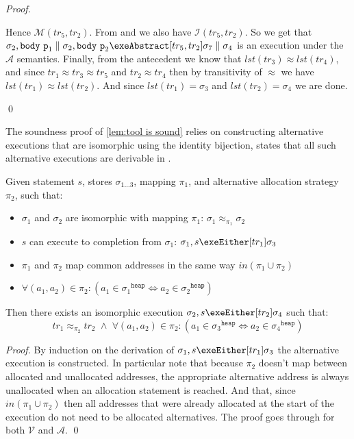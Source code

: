\documentclass[runningheads,a4paper]{llncs}
\DeclareMathOperator{\band}{\bm{\;\land\;}}
\DeclareMathOperator{\suchthat}{:}
\newcommand*{\qvars}[2]{#1_{#2}}
\newcommand*{\last}[1]{\mathit{lst}(#1)}
\newcommand{\tr}{tr}
\newcommand*\iso{\approx}
\newcommand*{\parcomp}{\parallel}
\newcommand*\Asemantics{\mathcal{A}}
\newcommand*\asemantics{$\Asemantics$ semantics}
\newcommand*\Vsemantics{\mathcal{V}}
\newcommand*{\body}{\mathtt{body}}
\newcommand*{\fun}{\texttt{p}}
\newcommand*{\bijection}[1]{\mathit{in}{\left(#1\right)}}
\newcommand*{\isoR}{\mathcal{I}}
\newcommand*{\mutR}{\mathcal{M}}
\newcommand*{\store}{\sigma}
\newcommand*{\heapof}[1]{{#1}^{\mathtt{heap}}}
\begin{document}
\begin{proof}
\begin{itemize}
Hence $\mutR(\tr_5,\tr_2)$. From \tagfive{} and \tagsix{} we also have $\isoR(\tr_5,\tr_2)$. So we get that $\store_2,\body~\fun_1\parcomp\store_2,\body~\fun_2\exeAbstract[\tr_5,\tr_2]\store_7\parcomp\store_4$ is an execution under the \asemantics{}. 
%
Finally, from the antecedent we know that $\last{\tr_3}\iso\last{\tr_4}$, and since $\tr_1\iso\tr_3\iso\tr_5$ and $\tr_2\iso\tr_4$ then by transitivity of $\iso$ we have $\last{\tr_1}\iso\last{\tr_2}$. And since $\last{\tr_1}=\store_3$ and $\last{\tr_2}=\store_4$ we are done.
%
\end{itemize}\qed\end{proof}

The soundness proof of \cref{lem:tool is sound} relies on constructing alternative executions that are isomorphic using the identity bijection,  states that all such alternative executions are derivable in \lang{}.

\begin{lemma}\label{lem:sufficient non-determinism}\setlength{\parindent}{0cm}
Given statement $s$, stores $\qvars{\store}{1 \ldots 3}$, mapping $\pi_1$, and alternative allocation strategy $\qvars{\pi}{2}$, such that: 
\begin{itemize}
	\item $\store_1$ and $\store_2$ are isomorphic with mapping $\pi_1$: $\store_1 \iso_{\pi_1} \store_2$
	\item $s$ can execute to completion from $\store_1$: $\store_1,s\exeEither[\tr_1]\store_3$
	\item $\pi_1$ and $\pi_2$ map common addresses in the same way $\bijection{\pi_1 \cup \pi_2}$
	\item %
		$\forall (a_1,a_2) \in \pi_2 \suchthat (a_1 \in \heapof{\store_1} \iff a_2 \in \heapof{\store_2})$
\end{itemize}

Then there exists an isomorphic execution $\store_2,s\exeEither[\tr_2]\store_4$ such that:
	\[\tr_1 \iso_{\pi_2} \tr_2 \band \forall (a_1,a_2) \in \pi_2 \suchthat (a_1 \in \heapof{\store_3} \iff a_2 \in \heapof{\store_4})\]
\end{lemma}
\begin{proof}By induction on the derivation of $\store_1,s\exeEither[\tr_1]\store_3$ the alternative execution is constructed. In particular note that because $\pi_2$ doesn't map between allocated and unallocated addresses, the appropriate alternative address is always unallocated when an allocation statement is reached. And that, since $\bijection{\pi_1 \cup \pi_2}$ then all addresses that were already allocated at the start of the execution do not need to be allocated alternatives. The proof goes through for both $\Vsemantics$ and $\Asemantics$.
\qed\end{proof}
\end{document}
